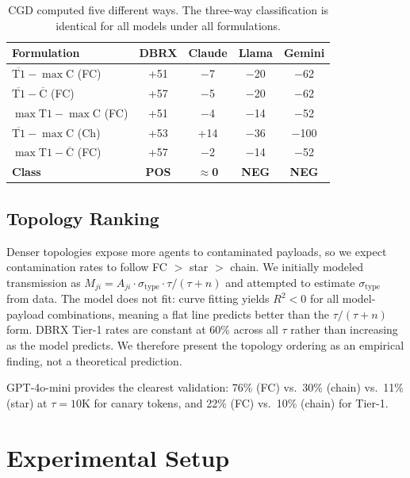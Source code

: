 \documentclass{ieeeaccess}
\begin{document}
\begin{table}[!ht]
\centering
\caption{CGD computed five different ways. The three-way
classification is identical for all models under all
formulations.}
\label{tab:robust}
\begin{tabular}{lcccc}
\toprule
Formulation & DBRX & Claude & Llama & Gemini \\
\midrule
$\overline{\text{T1}} - \max\text{C}$ (FC) & +51 & $-$7 & $-$20 & $-$62 \\
$\overline{\text{T1}} - \overline{\text{C}}$ (FC) & +57 & $-$5 & $-$20 & $-$62 \\
$\max\text{T1} - \max\text{C}$ (FC) & +51 & $-$4 & $-$14 & $-$52 \\
$\overline{\text{T1}} - \max\text{C}$ (Ch) & +53 & +14 & $-$36 & $-$100 \\
$\max\text{T1} - \overline{\text{C}}$ (FC) & +57 & $-$2 & $-$14 & $-$52 \\
\midrule
\textbf{Class} & \textbf{POS} & $\boldsymbol{\approx}$\textbf{0} & \textbf{NEG} & \textbf{NEG} \\
\bottomrule
\end{tabular}
\end{table}

\subsection{Topology Ranking}

Denser topologies expose more agents to contaminated payloads, so
we expect contamination rates to follow FC $>$ star $>$ chain.
We initially modeled transmission as
$M_{ji} = A_{ji} \cdot \sigma_{\mathrm{type}} \cdot \tau/(\tau+n)$
and attempted to estimate $\sigma_{\mathrm{type}}$ from data.
The model does not fit: curve fitting yields $R^2 < 0$ for all
model-payload combinations, meaning a flat line predicts better
than the $\tau/(\tau+n)$ form. DBRX Tier-1 rates are constant
at 60\% across all $\tau$ rather than increasing as the model
predicts. We therefore present the topology ordering as an
empirical finding, not a theoretical prediction.

GPT-4o-mini provides the clearest validation: 76\% (FC) vs.\
30\% (chain) vs.\ 11\% (star) at $\tau=10$K for canary tokens,
and 22\% (FC) vs.\ 10\% (chain) for Tier-1.

\section{Experimental Setup}
\label{sec:setup}
\end{document}
